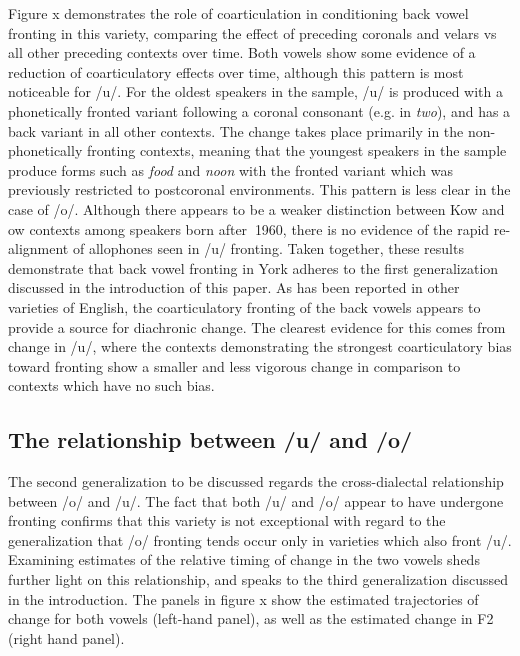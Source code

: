 \documentclass[12pt]{article}
\begin{document}
Figure x demonstrates the role of coarticulation in conditioning back vowel fronting in this variety, comparing the effect of preceding coronals and velars vs all other preceding contexts over time. Both vowels show some evidence of a reduction of coarticulatory effects over time, although this pattern is most noticeable for /u/. For the oldest speakers in the sample, /u/ is produced with a phonetically fronted variant following a coronal consonant (e.g. in \textit{two}), and has a back variant in all other contexts. The change takes place primarily in the non-phonetically fronting contexts, meaning that the youngest speakers in the sample produce forms such as \textit{food} and \textit{noon} with the fronted variant which was previously restricted to postcoronal environments. This pattern is less clear in the case of /o/. Although there appears to be a weaker distinction between Kow and ow contexts among speakers born after $~$1960, there is no evidence of the rapid re-alignment of allophones seen in /u/ fronting. Taken together, these results demonstrate that back vowel fronting in York adheres to the first generalization discussed in the introduction of this paper. As has been reported in other varieties of English, the coarticulatory fronting of the back vowels appears to provide a source for diachronic change. The clearest evidence for this comes from change in /u/, where the contexts demonstrating the strongest coarticulatory bias toward fronting show a smaller and less vigorous change in comparison to contexts which have no such bias. 

\subsection{The relationship between /u/ and /o/}
The second generalization to be discussed regards the cross-dialectal relationship between /o/ and /u/. The fact that both /u/ and /o/ appear to have undergone fronting confirms that this variety is not exceptional with regard to the generalization that /o/ fronting tends occur only in varieties which also front /u/. Examining estimates of the relative timing of change in the two vowels sheds further light on this relationship, and speaks to the third generalization discussed in the introduction. The panels in figure x show the estimated trajectories of change for both vowels (left-hand panel), as well as the estimated change in F2 (right hand panel). 
\end{document}
